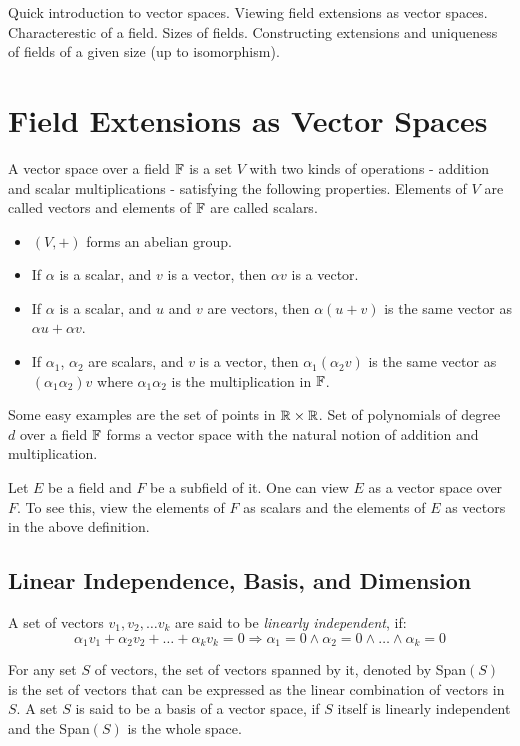 
\noindent

Quick introduction to vector spaces. Viewing field extensions as vector spaces. Characterestic of a field. Sizes of fields. Constructing extensions and uniqueness of fields of a given size (up to isomorphism).

\section{Field Extensions as Vector Spaces}

A vector space over a field ${\mathbb{F}}$ is a set $V$ with two kinds of operations - addition and scalar multiplications - satisfying the following properties. Elements of $V$ are called vectors and elements of ${\mathbb{F}}$ are called scalars.
\begin{itemize}
\item $(V,+)$ forms an abelian group.
\item If $\alpha$ is a scalar, and $v$ is a vector, then $\alpha v$ is a vector.
\item If $\alpha$ is a scalar, and $u$ and $v$ are vectors, then $\alpha(u+v)$ is the same vector as $\alpha u+ \alpha v$.
\item If $\alpha_1$, $\alpha_2$ are scalars, and $v$ is a vector, then $\alpha_1(\alpha_2 v)$ is the same vector as $(\alpha_1 \alpha_2)v$ where $\alpha_1\alpha_2$ is the multiplication in ${\mathbb{F}}$.
\end{itemize}

Some easy examples are the set of points in ${\mathbb{R}} \times {\mathbb{R}}$. Set of polynomials of degree $d$ over a field ${\mathbb{F}}$ forms a vector space with the natural notion of addition and multiplication.

Let $E$ be a field and $F$ be a subfield of it. One can view $E$ as a vector space over $F$. To see this, view the elements of $F$ as scalars and the elements of $E$ as vectors in the above definition.

\subsection{Linear Independence, Basis, and Dimension}

\begin{definition}
A set of vectors $v_1, v_2, \ldots v_k$ are said to be \textit{linearly independent}, if:
\[ \alpha_1v_1 + \alpha_2 v_2 + \ldots + \alpha_k v_k = 0 \Longrightarrow \alpha_1 = 0 \land \alpha_2 = 0 \land \ldots \land \alpha_k = 0 \]
\end{definition}
For any set $S$ of vectors, the set of vectors spanned by it, denoted by  {\sc Span}$(S)$ is the set of vectors that can be expressed as the linear combination of vectors in $S$. A set $S$ is said to be a basis of a vector space, if $S$ itself is linearly independent and the {\sc Span}$(S)$ is the whole space.

